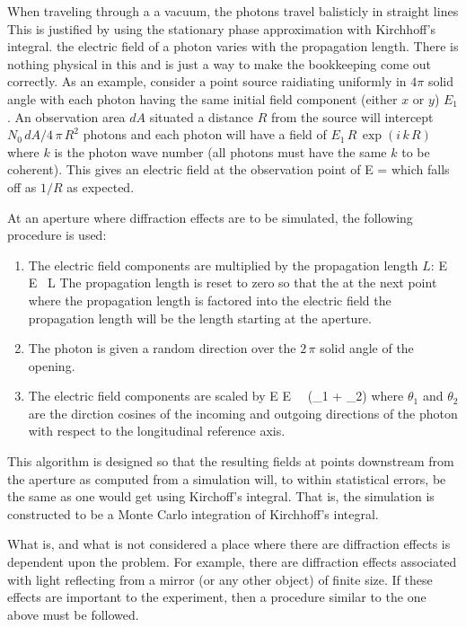 When traveling through a a vacuum, the photons travel balisticly in
straight lines This is justified by using the stationary phase
approximation with Kirchhoff's integral. the electric field of a
photon varies with the propagation length. There is nothing physical
in this and is just a way to make the bookkeeping come out
correctly. As an example, consider a point source raidiating uniformly
in $4\pi$ solid angle with each photon having the same initial field
component (either $x$ or $y$) $E_1$.  An observation area $dA$
situated a distance $R$ from the source will intercept $N_0 \, dA / 4
\, \pi \, R^2$ photons and each photon will have a field of $E_1 \, R
\, \exp(i \, k \, R)$ where $k$ is the photon wave number (all photons
must have the same $k$ to be coherent). This gives an electric field
at the observation point of
\Begineq
  E = 
\Endeq
which falls off as $1/R$ as expected.

At an aperture where diffraction effects are to be simulated, the
following procedure is used:
  \begin{enumerate}
  \item
The electric field components are multiplied by the propagation length $L$:
\Begineq
  E \rightarrow E \, L
\Endeq
The propagation length is reset to zero so that the at the next point
where the propagation length is factored into the electric field the
propagation length will be the length starting at the aperture.
  \item
The photon is given a random direction over the $2 \, \pi$ solid angle
of the opening.
  \item
The electric field components are scaled by
\Begineq
  E \rightarrow E \,  \, (\cos\theta_1 + \cos\theta_2)
\Endeq
where $\theta_1$ and $\theta_2$ are the dirction cosines of the
incoming and outgoing directions of the photon with respect to the
longitudinal reference axis.
  \end{enumerate}
This algorithm is designed so that the resulting fields at points
downstream from the aperture as computed from a simulation will, to
within statistical errors, be the same as one would get using
Kirchoff's integral. That is, the simulation is constructed to be a
Monte Carlo integration of Kirchhoff's integral.

What is, and what is not considered a place where there are
diffraction effects is dependent upon the problem. For example, there
are diffraction effects associated with light reflecting from a mirror
(or any other object) of finite size. If these effects are important
to the experiment, then a procedure similar to the one above must be
followed. 

